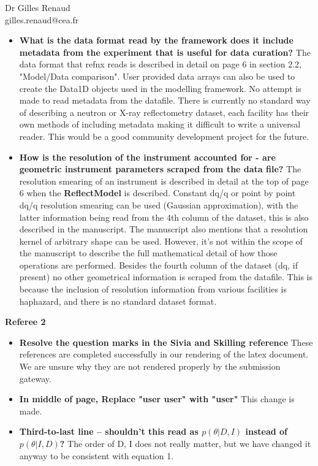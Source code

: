\documentclass[fontsize=12pt, paper=a4]{scrlttr2}
\begin{document}
\begin{letter}{Dr Gilles Renaud \\ gilles.renaud@cea.fr}
\begin{itemize}
\item \textbf{What is the data format read by the framework does it include metadata from the experiment that is useful for data curation?} The data format that refnx reads is described in detail on page 6 in section 2.2, "Model/Data comparison". User provided data arrays can also be used to create the Data1D objects used in the modelling framework. No attempt is made to read metadata from the datafile. There is currently no standard way of describing a neutron or X-ray reflectometry dataset, each facility has their own methods of including metadata making it difficult to write a universal reader. This would be a good community development project for the future.
\item \textbf{How is the resolution of the instrument accounted for - are geometric instrument parameters scraped from the data file?} The resolution smearing of an instrument is described in detail at the top of page 6 when the \textbf{ReflectModel} is described. Constant dq/q or point by point dq/q resolution smearing can be used (Gaussian approximation), with the latter information being read from the 4th column of the dataset, this is also described in the manuscript. The manuscript also mentions that a resolution kernel of arbitrary shape can be used. However, it's not within the scope of the manuscript to describe the full mathematical detail of how those operations are performed. Besides the fourth column of the dataset (dq, if present) no other geometrical information is scraped from the datafile. This is because the inclusion of resolution information from various facilities is haphazard, and there is no standard dataset format.

\end{itemize}


\vskip12pt
\noindent
\textbf{Referee 2}
\begin{itemize}
\item \textbf{Resolve the question marks in the Sivia and Skilling reference} These references are completed successfully in our rendering of the latex document. We are unsure why they are not rendered properly by the submission gateway.
\item \textbf{In middle of page, Replace "user user" with "user"} This change is made.
\item \textbf{Third-to-last line – shouldn't this read as $p(\theta|D,I)$ instead of $p(\theta|I,D)$?} The order of D, I does not really matter, but we have changed it anyway to be consistent with equation 1.
\end{itemize}



\end{letter}
\end{document}
